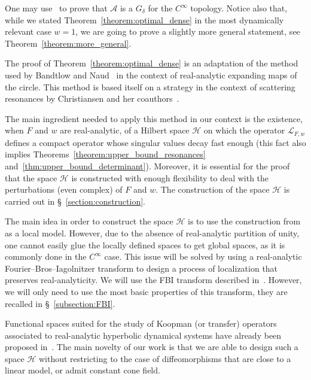 \documentclass[AHL,Unicode,longabstracts,published]{cedram}
\newcommand{\clL}{\mathcal{L}}
\newcommand{\clA}{\mathcal{A}}
\newcommand{\clH}{\mathcal{H}}
\begin{document}
\begin{rema}
One may use~\cite[Theorem~2.7]{gouezel_liverani_1} to prove that $\clA$ is a $G_\delta$ for the $C^\infty$ topology. Notice also that, while we stated Theorem~\ref{theorem:optimal_dense} in the most dynamically relevant case $w = 1$, we are going to prove a slightly more general statement, see Theorem~\ref{theorem:more_general}.
\end{rema}

The proof of Theorem~\ref{theorem:optimal_dense} is an adaptation of the method used by Bandtlow and Naud~\cite{bandtlow_naud} in the context of real-analytic expanding maps of the circle. This method is based itself on a strategy in the context of scattering resonances by Christiansen and her coauthors~\cite{christiansen_hyperbolic,
christiansen_potential,
christiansen_schrodinger,
christiansen_several,
christiansen_euclidean}.

The main ingredient needed to apply this method in our context is the existence, when $F$ and $w$ are real-analytic, of a Hilbert space $\clH$ on which the operator $\clL_{F,w}$ defines a compact operator whose singular values decay fast enough (this fact also implies Theorems~\ref{theorem:upper_bound_resonances} and~\ref{thm:upper_bound_determinant}). Moreover, it is essential for the proof that the space $\clH$ is constructed with enough flexibility to deal with the perturbations (even complex) of $F$ and $w$. The construction of the space $\clH$ is carried out in \S~\ref{section:construction}.

The main idea in order to construct the space $\clH$ is to use the construction from~\cite{faure_roy} as a local model. However, due to the absence of real-analytic partition of unity, one cannot easily glue the locally defined spaces to get global spaces, as it is commonly done in the $C^\infty$ case. This issue will be solved by using a real-analytic Fourier--Bros--Iagolnitzer transform to design a process of localization that preserves real-analyticity. We will use the FBI transform described in~\cite{BJ20}. However, we will only need to use the most basic properties of this transform, they are recalled in \S~\ref{subsection:FBI}.

Functional spaces suited for the study of Koopman (or transfer) operators associated to real-analytic hyperbolic dynamical systems have already been proposed in~\cite{faure_roy,other_example,first_example,
optimal_examples}. The main novelty of our work is that we are able to design such a space $\clH$ without restricting to the case of diffeomorphisms that are close to a linear model, or admit constant cone field.
\end{document}
